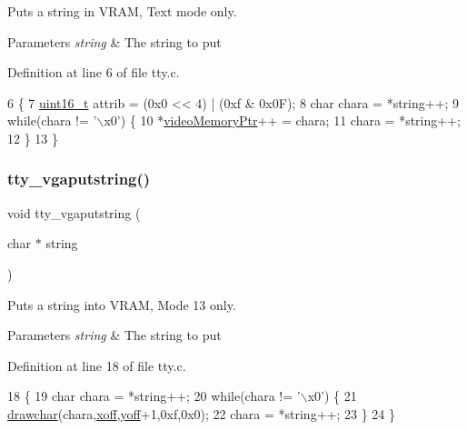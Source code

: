 Puts a string in V\+R\+AM, Text mode only. 


\begin{DoxyParams}{Parameters}
{\em string} & The string to put \\
\hline
\end{DoxyParams}


Definition at line 6 of file tty.\+c.


\begin{DoxyCode}
6                                  \{
7     \hyperlink{a00035_a273cf69d639a59973b6019625df33e30_a273cf69d639a59973b6019625df33e30}{uint16\_t} attrib = (0x0 << 4) | (0xf & 0x0F);
8     \textcolor{keywordtype}{char} chara = *\textcolor{keywordtype}{string}++;
9     \textcolor{keywordflow}{while}(chara != \textcolor{stringliteral}{'\(\backslash\)x0'}) \{
10         *\hyperlink{a00041_a3f896e9c00b9302e2287aad054199134_a3f896e9c00b9302e2287aad054199134}{videoMemoryPtr}++ = chara;
11         chara = *\textcolor{keywordtype}{string}++;
12     \}
13 \}
\end{DoxyCode}
\mbox{\label{a00044_a13ff2c06d56753c5666ca56cb2d81100_a13ff2c06d56753c5666ca56cb2d81100}} 
\subsubsection{\texorpdfstring{tty\+\_\+vgaputstring()}{tty\_vgaputstring()}}
{\footnotesize\ttfamily void tty\+\_\+vgaputstring (\begin{DoxyParamCaption}\item[{char $\ast$}]{string }\end{DoxyParamCaption})}



Puts a string into V\+R\+AM, Mode 13 only. 


\begin{DoxyParams}{Parameters}
{\em string} & The string to put \\
\hline
\end{DoxyParams}


Definition at line 18 of file tty.\+c.


\begin{DoxyCode}
18                                     \{
19     \textcolor{keywordtype}{char} chara = *\textcolor{keywordtype}{string}++;
20     \textcolor{keywordflow}{while}(chara != \textcolor{stringliteral}{'\(\backslash\)x0'}) \{
21         \hyperlink{a00008_a2c8df7a20b47341b70d97a7ff21d86ea_a2c8df7a20b47341b70d97a7ff21d86ea}{drawchar}(chara,\hyperlink{a00041_abaa0d20f0e52ce0d3a7d706f6ac16266_abaa0d20f0e52ce0d3a7d706f6ac16266}{xoff},\hyperlink{a00041_a1a7539764d0ae8cd06ce45c62cf92bca_a1a7539764d0ae8cd06ce45c62cf92bca}{yoff}+1,0xf,0x0);
22         chara = *\textcolor{keywordtype}{string}++;
23     \}
24 \}
\end{DoxyCode}
